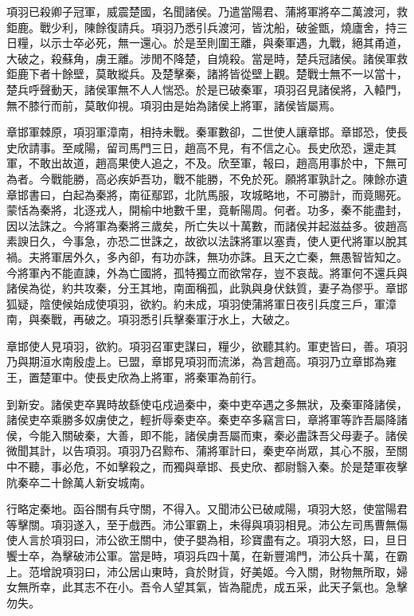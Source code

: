 項羽已殺卿子冠軍，威震楚國，名聞諸侯。乃遣當陽君、蒲將軍將卒二萬渡河，救鉅鹿。戰少利，陳餘復請兵。項羽乃悉引兵渡河，皆沈船，破釜甑，燒廬舍，持三日糧，以示士卒必死，無一還心。於是至則圍王離，與秦軍遇，九戰，絕其甬道，大破之，殺蘇角，虜王離。涉閒不降楚，自燒殺。當是時，楚兵冠諸侯。諸侯軍救鉅鹿下者十餘壁，莫敢縱兵。及楚擊秦，諸將皆從壁上觀。楚戰士無不一以當十，楚兵呼聲動天，諸侯軍無不人人惴恐。於是已破秦軍，項羽召見諸侯將，入轅門，無不膝行而前，莫敢仰視。項羽由是始為諸侯上將軍，諸侯皆屬焉。

章邯軍棘原，項羽軍漳南，相持未戰。秦軍數卻，二世使人讓章邯。章邯恐，使長史欣請事。至咸陽，留司馬門三日，趙高不見，有不信之心。長史欣恐，還走其軍，不敢出故道，趙高果使人追之，不及。欣至軍，報曰，趙高用事於中，下無可為者。今戰能勝，高必疾妒吾功，戰不能勝，不免於死。願將軍孰計之。陳餘亦遺章邯書曰，白起為秦將，南征鄢郢，北阬馬服，攻城略地，不可勝計，而竟賜死。蒙恬為秦將，北逐戎人，開榆中地數千里，竟斬陽周。何者。功多，秦不能盡封，因以法誅之。今將軍為秦將三歲矣，所亡失以十萬數，而諸侯并起滋益多。彼趙高素諛日久，今事急，亦恐二世誅之，故欲以法誅將軍以塞責，使人更代將軍以脫其禍。夫將軍居外久，多內卻，有功亦誅，無功亦誅。且天之亡秦，無愚智皆知之。今將軍內不能直諫，外為亡國將，孤特獨立而欲常存，豈不哀哉。將軍何不還兵與諸侯為從，約共攻秦，分王其地，南面稱孤，此孰與身伏鈇質，妻子為僇乎。章邯狐疑，陰使候始成使項羽，欲約。約未成，項羽使蒲將軍日夜引兵度三戶，軍漳南，與秦戰，再破之。項羽悉引兵擊秦軍汙水上，大破之。

章邯使人見項羽，欲約。項羽召軍吏謀曰，糧少，欲聽其約。軍吏皆曰，善。項羽乃與期洹水南殷虛上。已盟，章邯見項羽而流涕，為言趙高。項羽乃立章邯為雍王，置楚軍中。使長史欣為上將軍，將秦軍為前行。

到新安。諸侯吏卒異時故繇使屯戍過秦中，秦中吏卒遇之多無狀，及秦軍降諸侯，諸侯吏卒乘勝多奴虜使之，輕折辱秦吏卒。秦吏卒多竊言曰，章將軍等詐吾屬降諸侯，今能入關破秦，大善，即不能，諸侯虜吾屬而東，秦必盡誅吾父母妻子。諸侯微聞其計，以告項羽。項羽乃召黥布、蒲將軍計曰，秦吏卒尚眾，其心不服，至關中不聽，事必危，不如擊殺之，而獨與章邯、長史欣、都尉翳入秦。於是楚軍夜擊阬秦卒二十餘萬人新安城南。

行略定秦地。函谷關有兵守關，不得入。又聞沛公已破咸陽，項羽大怒，使當陽君等擊關。項羽遂入，至于戲西。沛公軍霸上，未得與項羽相見。沛公左司馬曹無傷使人言於項羽曰，沛公欲王關中，使子嬰為相，珍寶盡有之。項羽大怒，曰，旦日饗士卒，為擊破沛公軍。當是時，項羽兵四十萬，在新豐鴻門，沛公兵十萬，在霸上。范增說項羽曰，沛公居山東時，貪於財貨，好美姬。今入關，財物無所取，婦女無所幸，此其志不在小。吾令人望其氣，皆為龍虎，成五采，此天子氣也。急擊勿失。

